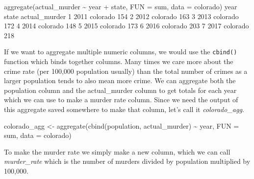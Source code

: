 \documentclass[
  12pt,
]{book}
\newenvironment{Shaded}{\begin{snugshade}}{\end{snugshade}}
\newcommand{\AttributeTok}[1]{\textcolor[rgb]{0.61,0.61,0.61}{#1}}
\newcommand{\DecValTok}[1]{\textcolor[rgb]{0.06,0.06,0.06}{#1}}
\newcommand{\FunctionTok}[1]{\textcolor[rgb]{0,0,0}{#1}}
\newcommand{\NormalTok}[1]{#1}
\newcommand{\OtherTok}[1]{\textcolor[rgb]{0.37,0.37,0.37}{#1}}
\newcommand{\SpecialCharTok}[1]{\textcolor[rgb]{0,0,0}{#1}}
\begin{document}
\begin{Shaded}
\begin{Highlighting}[]
\FunctionTok{aggregate}\NormalTok{(actual\_murder }\SpecialCharTok{\textasciitilde{}}\NormalTok{ year }\SpecialCharTok{+}\NormalTok{ state, }\AttributeTok{FUN =}\NormalTok{ sum, }\AttributeTok{data =}\NormalTok{ colorado)}
\NormalTok{  year    state actual\_murder}
\DecValTok{1} \DecValTok{2011}\NormalTok{ colorado           }\DecValTok{154}
\DecValTok{2} \DecValTok{2012}\NormalTok{ colorado           }\DecValTok{163}
\DecValTok{3} \DecValTok{2013}\NormalTok{ colorado           }\DecValTok{172}
\DecValTok{4} \DecValTok{2014}\NormalTok{ colorado           }\DecValTok{148}
\DecValTok{5} \DecValTok{2015}\NormalTok{ colorado           }\DecValTok{173}
\DecValTok{6} \DecValTok{2016}\NormalTok{ colorado           }\DecValTok{203}
\DecValTok{7} \DecValTok{2017}\NormalTok{ colorado           }\DecValTok{218}
\end{Highlighting}
\end{Shaded}

If we want to aggregate multiple numeric columns, we would use the \texttt{cbind()} function which binds together columns. Many times we care more about the crime rate (per 100,000 population usually) than the total number of crimes as a larger population tends to also mean more crime. We can aggregate both the population column and the actual\_murder column to get totals for each year which we can use to make a murder rate column. Since we need the output of this aggregate saved somewhere to make that column, let's call it \emph{colorado\_agg}.

\begin{Shaded}
\begin{Highlighting}[]
\NormalTok{colorado\_agg }\OtherTok{\textless{}{-}} \FunctionTok{aggregate}\NormalTok{(}\FunctionTok{cbind}\NormalTok{(population, actual\_murder) }\SpecialCharTok{\textasciitilde{}}\NormalTok{ year, }\AttributeTok{FUN =}\NormalTok{ sum, }\AttributeTok{data =}\NormalTok{ colorado)}
\end{Highlighting}
\end{Shaded}

To make the murder rate we simply make a new column, which we can call \emph{murder\_rate} which is the number of murders divided by population multiplied by 100,000.

\begin{Shaded}
\end{Shaded}
\end{document}
